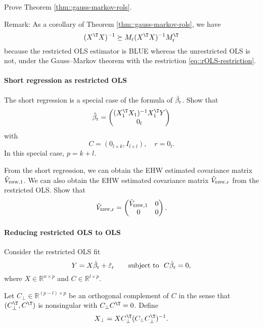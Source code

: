 Prove Theorem \ref{thm::gauss-markov-rols}. 

Remark: As a corollary of Theorem \ref{thm::gauss-markov-rols}, we have
$$
(X^{\T}X)^{-1} \succeq
M_\textup{r} (X^{\T}X)^{-1} M_\textup{r}^{\T} 
$$
because the restricted OLS estimator is BLUE whereas the unrestricted OLS is not, under the Gauss--Markov theorem with the restriction \eqref{eq::rOLS-restriction}. 


\paragraph{Short regression as restricted OLS}
\label{para::short-regression-rols}

The short regression is a  special case of the formula of $\hat{\beta}_\textup{r} $. Show that 
$$
\hat{\beta}_\textup{r}  = 
\begin{pmatrix}
(X_1^{\T} X_1)^{-1} X_1^{\T} Y  \\
0_l 
\end{pmatrix}
$$ 
with
$$
C  = (0_{l\times k}, I_{l\times l}),\quad r=0_l. 
$$
In this special case, $p=k+l$. 

From the short regression, we can obtain the EHW estimated covariance matrix $\hat{V}_{\textsc{ehw}, 1}$. We can also obtain the EHW estimated covariance matrix $\hat{V}_{\textsc{ehw}, \textup{r}} $ from the restricted OLS. Show that
$$
\hat{V}_{\textsc{ehw}, \textup{r}}  = \begin{pmatrix}
\hat{V}_{\textsc{ehw}, 1} & 0 \\
0 & 0 
\end{pmatrix} .
$$




\paragraph{Reducing restricted OLS to OLS}\label{para::rols-to-ols}




Consider the restricted OLS fit 
\begin{equation}
\label{eq::hw-rols}
Y = X  \hat{\beta}_\textup{r} + \hat{\varepsilon}_\textup{r}   \qquad \text{subject to} \ \  C \hat{\beta}_\textup{r} = 0,
\end{equation}
where $X \in \mathbb R^{n\times p}$ and $C \in \mathbb R^{l \times p}$. 

Let $C_\perp \in \mathbb R^{(p-l) \times p}$ be an orthogonal complement of $C$ in the sense that $(C_\perp^{\T}, C^{\T})$ is nonsingular with $ C_\perp C^{\T} = 0$. Define 
$$
X_{\perp} = X  C_\perp^{\T} (C_\perp C_\perp^{\T})^{-1} .
$$

